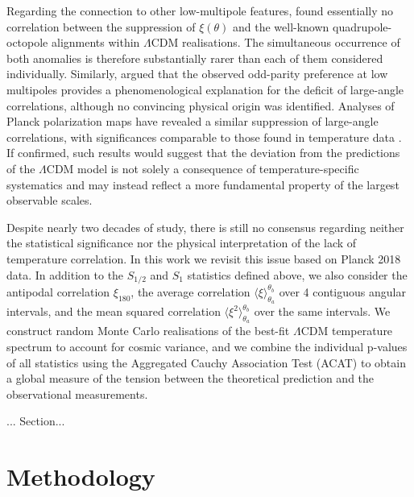 \documentclass[apj,twocolumn,numberedappendix]{openjournal}
\begin{document}
Regarding the connection to other low-multipole features, \citet{Sarkar2010Missing} found essentially no correlation between the suppression of $\xi(\theta)$ and the well-known quadrupole-octopole alignments within $\Lambda$CDM realisations.
The simultaneous occurrence of both anomalies is therefore substantially rarer than each of them considered individually.
Similarly, \citet{Kim2011} argued that the observed odd-parity preference at low multipoles provides a phenomenological explanation for the deficit of large-angle correlations, although no convincing physical origin was identified.
Analyses of Planck polarization maps have revealed a similar suppression of large-angle correlations, with significances comparable to those found in temperature data \citep{Chiocchetta2020Lack-of-correlation}.
If confirmed, such results would suggest that the deviation from the predictions of the $\Lambda$CDM model is not solely a consequence of temperature-specific systematics and may instead reflect a more fundamental property of the largest observable scales.

Despite nearly two decades of study, there is still no consensus regarding neither the statistical significance nor the physical interpretation of the lack of temperature correlation.
In this work we revisit this issue based on Planck 2018 data.
In addition to the $S_{1/2}$ and $S_1$ statistics defined above, we also consider the antipodal correlation $\xi_{180}$, the average correlation $\langle\xi\rangle_{\theta_a}^{\theta_b}$ over 4 contiguous angular intervals, and the mean squared correlation $\langle\xi^2\rangle_{\theta_a}^{\theta_b}$ over the same intervals.
We construct random Monte Carlo realisations of the best-fit $\Lambda$CDM temperature spectrum to account for cosmic variance, and we combine the individual p-values of all statistics using the Aggregated Cauchy Association Test (ACAT) to obtain a global measure of the tension between the theoretical prediction and the observational measurements.

... Section...

\section{Methodology}
\end{document}
